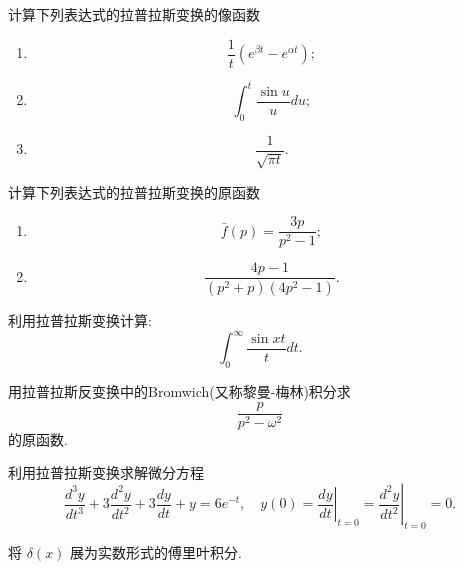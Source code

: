 \documentclass[11pt]{article}
\begin{document}
\begin{hwproblem}{}
    计算下列表达式的拉普拉斯变换的像函数
    \begin{enumerate}
      \item $$
      \frac{1}{t}\left(e^{\beta t}-e^{\alpha t}\right) ;
      $$
      \item $$
      \int_0^t \frac{\sin u}{u} d u;
      $$
      \item 
      $$
      \frac{1}{\sqrt{\pi t}}.
      $$
    \end{enumerate}
\end{hwproblem}

\vspace{0.5cm}

\begin{hwproblem}{}
    计算下列表达式的拉普拉斯变换的原函数
    \begin{enumerate}
      \item $$
      \bar{f}(p)=\frac{3 p}{p^2-1} ;
      $$
      \item $$
      \frac{4 p-1}{\left(p^2+p\right)\left(4 p^2-1\right)}.
      $$
    \end{enumerate}
\end{hwproblem}

\vspace{0.5cm}

\begin{hwproblem}{}
    利用拉普拉斯变换计算:  $$\int_0^{\infty} \frac{\sin x t}{t} dt. $$
\end{hwproblem}

\vspace{0.5cm}
   
\begin{hwproblem}{}
用拉普拉斯反变换中的Bromwich(又称黎曼-梅林)积分求
$$
\frac{p}{p^2 - \omega^2}
$$
的原函数.
\end{hwproblem}

\vspace{0.5cm}

\begin{hwproblem}{}
    利用拉普拉斯变换求解微分方程
    $$
      \frac{d^3 y}{d t^3}+3 \frac{d^2 y}{d t^2}+3 \frac{d y}{d t}+y=6 e^{-t}, 
      \quad y(0)=\left.\frac{d y}{d t}\right|_{t=0}=\left.\frac{d^2 y}{d t^2}\right|_{t=0}=0 .
    $$
\end{hwproblem}

\vspace{0.5cm}
  

\begin{hwproblem}{}
    将 $\delta(x)$ 展为实数形式的傅里叶积分.
\end{hwproblem}
\end{document}
